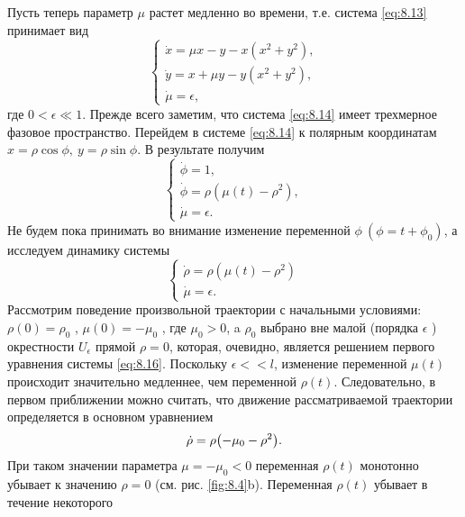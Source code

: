 Пусть теперь параметр $\mu$ растет медленно во времени, т.е. система \eqref{eq:8.13} принимает вид
\begin{equation}
        \label{eq:8.14}
        \begin{cases}
                \dot x = \mu x - y - x(x^2+y^2), \\
                \dot y = x + \mu y - y(x^2+y^2),\\ 
                \dot \mu = \epsilon,
        \end{cases}
\end{equation}
где $0<\epsilon\ll 1$. Прежде всего заметим, что система \eqref{eq:8.14} имеет трехмерное фазовое пространство. Перейдем в системе 
\eqref{eq:8.14} к полярным координатам $x=\rho\cos \phi,~ y = \rho\sin \phi$. В результате получим
\begin{equation}
        \label{eq:8.15}
        \begin{cases}
                \dot \phi =1,\\
                \dot \phi = \rho( \mu(t) - \rho^2),\\
                \dot \mu = \epsilon.
        \end{cases}
\end{equation}
Не будем пока принимать во внимание изменение переменной $\phi~(\phi=t+\phi_0)$, а исследуем динамику системы
\begin{equation}
        \label{eq:8.16}
        \begin{cases}
                \dot \rho = \rho( \mu(t) - \rho^2)\\
                \dot \mu = \epsilon.
        \end{cases}
\end{equation}
Рассмотрим поведение произвольной траектории с начальными условиями:
$\rho(0) = \rho_0$ , $\mu(0) = - \mu_0$ , где $\mu_0>0$, a $\rho_0$  
выбрано вне малой (порядка $\epsilon$ ) окрестности $U_{\epsilon}$
прямой $\rho=0$, которая, очевидно, является решением первого уравнения системы
\eqref{eq:8.16}. Поскольку $\epsilon<<l$, изменение переменной $\mu(t)$ происходит значительно
медленнее, чем переменной $\rho(t)$. Следовательно, в первом приближении можно
считать, что движение рассматриваемой траектории определяется в основном
уравнением
\begin{equation}
        \label{eq:8.17}
        \dot \rho = \rho \qty( - \mu_0 - \rho^2).
\end{equation}
При таком значении параметра $\mu= - \mu_0<0$ переменная $\rho(t)$ монотонно убывает к
значению $\rho=0$ (см. рис. \ref{fig:8.4}b). Переменная $\rho(t)$ убывает в течение некоторого
